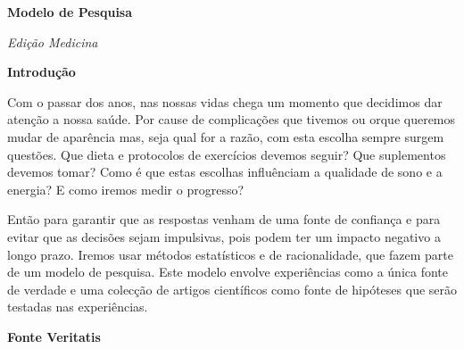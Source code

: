 \documentclass[12pt]{article}
\begin{document}
 

\begin{titlepage}
    \begin{center}
        \Huge\textbf{Modelo de Pesquisa}
         
        \Large\textit{Edi\c c\~ao Medicina}
         
        \vspace{10cm}
    \end{center}
\end{titlepage}

\begin{center}
    \Huge\textbf{Introdu\c c\~ao}
\end{center}

\justifying
Com o passar dos anos, nas nossas vidas chega um momento que decidimos dar
aten\c c\~ao a nossa sa\'ude.  Por cause de complica\c c\~oes que tivemos ou
orque queremos mudar de apar\^encia mas, seja qual for a raz\~ao,  com esta
escolha sempre surgem quest\~oes. Que dieta e protocolos de exerc\'icios
devemos seguir? Que suplementos devemos tomar? Como \'e que estas escolhas
influ\^enciam a qualidade de sono e a energia? E como iremos medir o progresso?

\noindent
Ent\~ao para garantir que as respostas venham de uma fonte de confian\c ca e
para evitar que as decis\~oes sejam impulsivas, pois podem ter um impacto
negativo a longo prazo.  Iremos usar m\'etodos estat\'isticos e de
racionalidade, que fazem parte de um modelo de pesquisa. Este modelo envolve
experi\^encias como a \'unica fonte de verdade e uma colec\c c\~ao de artigos
cient\'ificos como fonte de hip\'oteses que ser\~ao testadas nas
experi\^encias. 



\pagebreak


\begin{center}
    \Huge\textbf{Fonte Veritatis}
\end{center}
\end{document}
